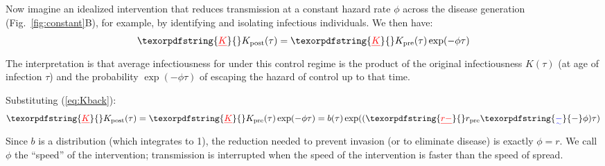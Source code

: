 \documentclass[12pt]{article}
\newcommand{\KK}{\ensuremath{{K}}} %
\newcommand{\Kx}[1]{\ensuremath{\KK_{\mathrm{#1}}}} %
\newcommand{\Kpre}{\Kx{pre}} %
\newcommand{\Kpost}{\Kx{post}} %
\newcommand{\rr}{\ensuremath{{r}}}
\newcommand{\rx}[1]{\ensuremath{\rr_{\mathrm{#1}}}} %
\newcommand{\rpre}{\rx{pre}} %
\newcommand{\figref}[1]{Fig.~\ref{fig:#1}}
\renewcommand{\eqref}[1]{(\ref{eq:#1})} %
\providecommand{\DIFaddtex}[1]{{\protect\color{blue}\uwave{#1}}} %
\providecommand{\DIFdeltex}[1]{{\protect\color{red}\sout{#1}}}                      %
\providecommand{\DIFaddbegin}{} %
\providecommand{\DIFaddend}{} %
\providecommand{\DIFdelbegin}{} %
\providecommand{\DIFdelend}{} %
\providecommand{\DIFadd}[1]{\texorpdfstring{\DIFaddtex{#1}}{#1}} %
\providecommand{\DIFdel}[1]{\texorpdfstring{\DIFdeltex{#1}}{}} %
\newcommand{\DIFscaledelfig}{0.5}
\newlength{\DIFdelgraphicswidth} %
\newlength{\DIFdelgraphicsheight} %
\newcommand{\DIFaddincludegraphics}[2][]{{\color{blue}\fbox{\DIFOincludegraphics[#1]{#2}}}} %
\newcommand{\DIFdelincludegraphics}[2][]{%
\sbox{\DIFdelgraphicsbox}{\DIFOincludegraphics[#1]{#2}}%
\settoboxwidth{\DIFdelgraphicswidth}{\DIFdelgraphicsbox} %
\settoboxtotalheight{\DIFdelgraphicsheight}{\DIFdelgraphicsbox} %
\scalebox{\DIFscaledelfig}{%
\parbox[b]{\DIFdelgraphicswidth}{\usebox{\DIFdelgraphicsbox}\\[-\baselineskip] \rule{\DIFdelgraphicswidth}{0em}}\llap{\resizebox{\DIFdelgraphicswidth}{\DIFdelgraphicsheight}{%
\setlength{\unitlength}{\DIFdelgraphicswidth}%
\begin{picture}(1,1)%
\thicklines\linethickness{2pt} %
{\color[rgb]{1,0,0}\put(0,0){\framebox(1,1){}}}%
{\color[rgb]{1,0,0}\put(0,0){\line( 1,1){1}}}%
{\color[rgb]{1,0,0}\put(0,1){\line(1,-1){1}}}%
\end{picture}%
}\hspace*{3pt}}} %
} %
\DeclareRobustCommand{\DIFaddbegin}{\DIFOaddbegin \let\includegraphics\DIFaddincludegraphics} %
\DeclareRobustCommand{\DIFaddend}{\DIFOaddend \let\includegraphics\DIFOincludegraphics} %
\DeclareRobustCommand{\DIFdelbegin}{\DIFOdelbegin \let\includegraphics\DIFdelincludegraphics} %
\DeclareRobustCommand{\DIFdelend}{\DIFOaddend \let\includegraphics\DIFOincludegraphics} %
\begin{document}
Now imagine an idealized intervention that reduces transmission at a constant hazard rate $\phi$ across the disease generation (\figref{constant}B), for example, by identifying and isolating infectious individuals.
We then have:
\begin{equation}
	\DIFdelbegin %
\DIFdel{K}\DIFdelend \DIFaddbegin \Kpost\DIFaddend (\tau) = \DIFdelbegin \DIFdel{K}\DIFdelend \DIFaddbegin \Kpre\DIFaddend (\tau)\exp(-\phi\tau)
\end{equation}
The interpretation is that average infectiousness for under this control regime is the product of the original infectiousness \DIFdelbegin \DIFdel{$K(\tau)$ }\DIFdelend \DIFaddbegin \DIFadd{$\Kpre(\tau)$ }\DIFaddend (at age of infection $\tau$) and the probability $\exp(-\phi\tau)$ of escaping the hazard of control up to that time.

Substituting \eqref{Kback}:
\begin{equation}
	\DIFdelbegin %
\DIFdel{K}\DIFdelend \DIFaddbegin \Kpost\DIFaddend (\tau) = \DIFdelbegin \DIFdel{K}\DIFdelend \DIFaddbegin \Kpre\DIFaddend (\tau)\exp(-\phi\tau) = b(\tau)\exp((\DIFdelbegin \DIFdel{r-}\DIFdelend \DIFaddbegin \rpre\DIFadd{-}\DIFaddend \phi)\tau)
\end{equation}
Since $b$ is a distribution (which integrates to 1), the reduction needed to prevent invasion (or to eliminate disease) is exactly \DIFdelbegin \DIFdel{$\phi=r$}\DIFdelend \DIFaddbegin \DIFadd{$\phi=\rpre$}\DIFaddend . 
We call $\phi$ the ``speed'' of the intervention; transmission is interrupted when the speed of the intervention is faster than the speed of spread.
\end{document}
